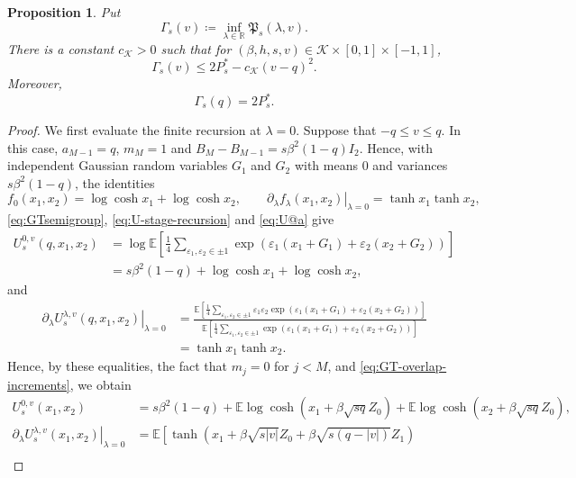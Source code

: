\documentclass[11pt]{article}
\newtheorem{proposition}[theorem]{Proposition}
\numberwithin{equation}{section}
\newcommand{\E}{\mathbb{E}}
\newcommand{\1}{\mathbf 1}
\newcommand{\cK}{\mathcal K}
\begin{document}
\begin{proposition}
\label{prop:GTcoercivity}
Put
\[
 \Gamma_s(v)\coloneqq\inf_{\lambda\in\mathbb R}
 \mathfrak P_s(\lambda,v).
\]
There is a constant $c_{\cK}>0$ such that for $(\beta,h,s,v)\in\cK\times[0,1]\times[-1,1]$,
\begin{equation}
 \Gamma_s(v)
 \le 2P_s^*-c_{\cK}(v-q)^2.
 \label{eq:Gamma-coercivity}
\end{equation}
Moreover,
\begin{equation}
 \Gamma_s(q)=2P_s^*.
 \label{eq:Gamma-at-q}
\end{equation}
\end{proposition}

\begin{proof}

We first evaluate the finite recursion at $\lambda=0$.
Suppose that
$-q\le v\le q$.
In this case, $a_{M-1}=q$, $m_M =1$ and $B_M - B_{M-1} = s\beta ^2 (1-q)I_2$.
Hence, with independent Gaussian random variables $G_1$ and $G_2$ with means $0$ and variances $s\beta ^2(1-q)$, the identities
\[
 f_0(x_1,x_2)=\log\cosh x_1+\log\cosh x_2,
 \qquad
 \left.\partial_\lambda f_\lambda(x_1,x_2)
 \right|_{\lambda=0}=\tanh x_1\tanh x_2 ,
\]
\eqref{eq:GTsemigroup}, \eqref{eq:U-stage-recursion} and \eqref{eq:U@a} give 
\begin{align*}
 U_s^{0,v}(q,x_1,x_2) & = \log \E \left[ \frac{1}{4} \sum _{\varepsilon _1, \varepsilon _2 \in {\pm 1}} \exp (\varepsilon _1 (x_1 + G_1) + \varepsilon _2 (x_2 + G_2))\right] \\
 &=s\beta^2(1-q)+\log\cosh x_1+\log\cosh x_2,
\end{align*}
and
\begin{align*}
 \left.\partial_\lambda U_s^{\lambda,v}(q,x_1,x_2) \right|_{\lambda=0}
 &= \frac{\E \left[ \frac{1}{4} \sum _{\varepsilon _1, \varepsilon _2 \in {\pm 1}} \varepsilon _1 \varepsilon _2 \exp (\varepsilon _1 (x_1 + G_1) + \varepsilon _2 (x_2 + G_2))\right]}{\E \left[ \frac{1}{4} \sum _{\varepsilon _1, \varepsilon _2 \in {\pm 1}} \exp (\varepsilon _1 (x_1 + G_1) + \varepsilon _2 (x_2 + G_2))\right]}\\
 &=\tanh x_1\tanh x_2.
\end{align*}
Hence, by these equalities, the fact that $m_j=0$ for $j<M$, and \eqref{eq:GT-overlap-increments}, we obtain
\begin{align}
U_s^{0,v}(x_1,x_2) &= s\beta^2(1-q) + \E \log\cosh (x_1 + \beta \sqrt{sq}Z_0 ) + \E \log\cosh (x_2 + \beta \sqrt{sq}Z_0 ), \\
\left.\partial_\lambda U_s^{\lambda,v}(x_1,x_2) \right|_{\lambda=0} &= \E \left[ \tanh (x_1 + \beta \sqrt{s|v|}Z_0 + \beta \sqrt{s(q -|v|)} Z_1) \right. \nonumber\\

\end{align}
\end{proof}
\end{document}
